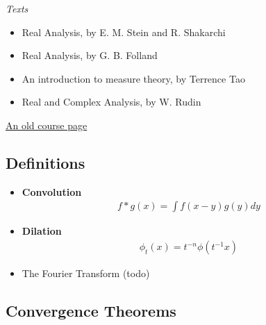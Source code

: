 \emph{Texts}

\begin{itemize}
\tightlist
\item
  Real Analysis, by E. M. Stein and R. Shakarchi
\item
  Real Analysis, by G. B. Folland
\item
  An introduction to measure theory, by Terrence Tao
\item
  Real and Complex Analysis, by W. Rudin
\end{itemize}

\href{http://alpha.math.uga.edu/~lyall/8100Fall2014/index.html}{An old
course page}

\hypertarget{definitions}{%
\subsection{Definitions}\label{definitions}}

\begin{itemize}
\item
  \textbf{Convolution}
  \begin{align*}
  f * g(x)=\int f(x-y) g(y) d y
  \end{align*}
\item
  \textbf{Dilation}
  \begin{align*}
  \phi_{t}(x)=t^{-n} \phi\left(t^{-1} x\right)
  \end{align*}
\item
  The Fourier Transform (todo)
\end{itemize}

\hypertarget{convergence-theorems}{%
\subsection{Convergence Theorems}\label{convergence-theorems}}

